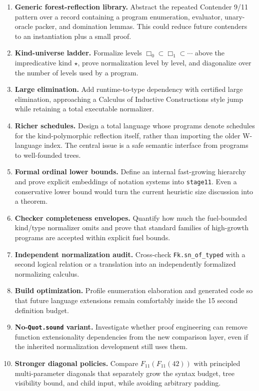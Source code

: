 \documentclass[11pt]{article}
\theoremstyle{definition}
\theoremstyle{remark}
\newcommand{\lean}[1]{\texttt{#1}}
\begin{document}
\begin{enumerate}[leftmargin=*,label=\textbf{R\arabic*.}]
\item \textbf{Generic forest-reflection library.}
  Abstract the repeated Contender 9/11 pattern over a record containing a
  program enumeration, evaluator, unary-oracle packer, and domination lemmas.
  This could reduce future contenders to an instantiation plus a small proof.
\item \textbf{Kind-universe ladder.}
  Formalize levels $\Box_0\subset\Box_1\subset\cdots$ above the impredicative
  kind $\star$, prove normalization level by level, and diagonalize over the
  number of levels used by a program.
\item \textbf{Large elimination.}
  Add runtime-to-type dependency with certified large elimination, approaching
  a Calculus of Inductive Constructions style jump while retaining a total
  executable normalizer.
\item \textbf{Richer schedules.}
  Design a total language whose programs denote schedules for the
  kind-polymorphic reflection itself, rather than importing the older
  W-language index.  The central issue is a safe semantic interface from
  programs to well-founded trees.
\item \textbf{Formal ordinal lower bounds.}
  Define an internal fast-growing hierarchy and prove explicit embeddings of
  notation systems into \lean{stage11}.  Even a conservative lower bound would
  turn the current heuristic size discussion into a theorem.
\item \textbf{Checker completeness envelopes.}
  Quantify how much the fuel-bounded kind/type normalizer omits and prove that
  standard families of high-growth programs are accepted within explicit fuel
  bounds.
\item \textbf{Independent normalization audit.}
  Cross-check \lean{Fk.sn\_of\_typed} with a second logical relation or a
  translation into an independently formalized normalizing calculus.
\item \textbf{Build optimization.}
  Profile enumeration elaboration and generated code so that future language
  extensions remain comfortably inside the 15 second definition budget.
\item \textbf{No-\lean{Quot.sound} variant.}
  Investigate whether proof engineering can remove function extensionality
  dependencies from the new comparison layer, even if the inherited
  normalization development still uses them.
\item \textbf{Stronger diagonal policies.}
  Compare $F_{11}(F_{11}(42))$ with principled multi-parameter diagonals that
  separately grow the syntax budget, tree visibility bound, and child input,
  while avoiding arbitrary padding.
\end{enumerate}
\end{document}
